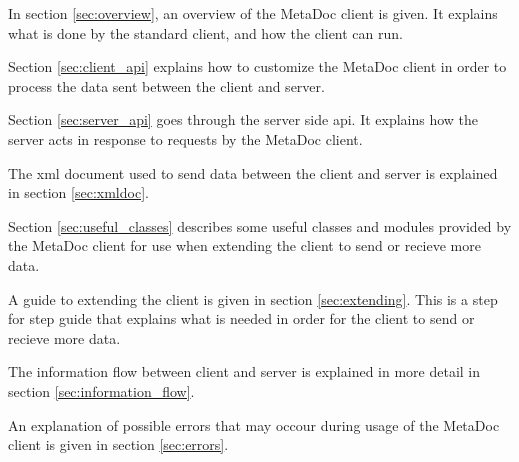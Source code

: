 In section \ref{sec:overview}, an overview of the MetaDoc client is given. It
explains what is done by the standard client, and how the client can run. 

Section \ref{sec:client_api} explains how to customize the MetaDoc client in
order to process the data sent between the client and server. 

Section \ref{sec:server_api} goes through the server side \gls{api}. It
explains how the server acts in response to requests by the MetaDoc client. 

The \gls{xml} document used to send data between the client and server is
explained in section \ref{sec:xmldoc}. 

Section \ref{sec:useful_classes} describes some useful classes and modules
provided by the MetaDoc client for use when extending the client to send or
recieve more data. 

A guide to extending the client is given in section \ref{sec:extending}. This
is a step for step guide that explains what is needed in order for the client
to send or recieve more data. 

The information flow between client and server is explained in more detail in
section \ref{sec:information_flow}.

An explanation of possible errors that may occour during usage of the MetaDoc
client is given in section \ref{sec:errors}. 
